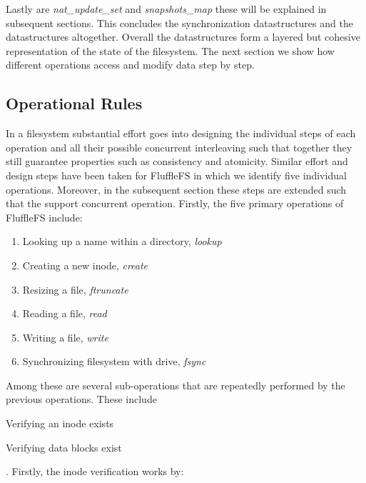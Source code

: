 Lastly are \textit{nat\_update\_set} and \textit{snapshots\_map} these will be
explained in subsequent sections. This concludes the synchronization
datastructures and the datastructures altogether. Overall the datastructures
form a layered but cohesive representation of the state of the filesystem. The
next section we show how different operations access and modify data step by
step.

\subsection{Operational Rules}

In a filesystem substantial effort goes into designing the individual steps of
each operation and all their possible concurrent interleaving such that
together they still guarantee properties such as consistency and atomicity.
Similar effort and design steps have been taken for FluffleFS in which we
identify five individual operations. Moreover, in the subsequent section these
steps are extended such that the support concurrent operation. Firstly, the
five primary operations of FluffleFS include:

\begin{enumerate}
    \item Looking up a name within a directory, \textit{lookup}
    \item Creating a new inode, \textit{create}
    \item Resizing a file, \textit{ftruncate}
    \item Reading a file, \textit{read}
    \item Writing a file, \textit{write}
    \item Synchronizing filesystem with drive, \textit{fsync}
\end{enumerate}

Among these are several sub-operations that are repeatedly performed by the
previous operations. These include \begin{enumerate*} \item Verifying an inode
exists \item Verifying data blocks exist \end{enumerate*}. Firstly, the
inode verification works by:

